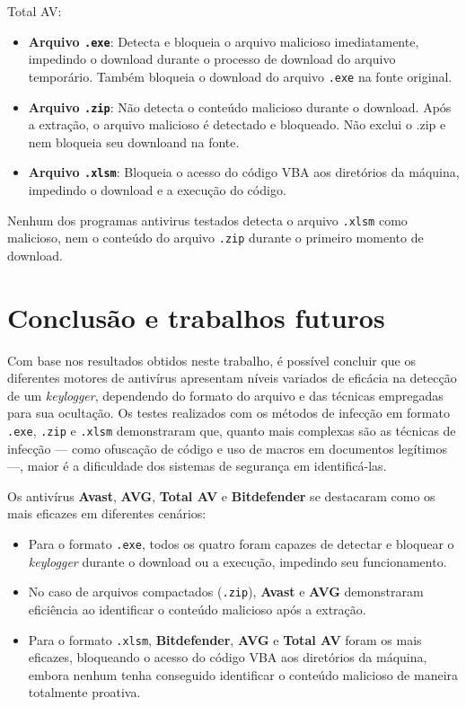 \documentclass[12pt]{article}
\begin{document}
\noindent Total AV:
\begin{itemize}
    \item \textbf{Arquivo \texttt{.exe}}: Detecta e bloqueia o arquivo malicioso imediatamente, impedindo o download durante o processo de download do arquivo temporário. Também bloqueia o download do arquivo \texttt{.exe} na fonte original.
    \item \textbf{Arquivo \texttt{.zip}}: Não detecta o conteúdo malicioso durante o download. Após a extração, o arquivo malicioso é detectado e bloqueado. Não exclui o .zip e nem bloqueia seu downloand na fonte.
    \item \textbf{Arquivo \texttt{.xlsm}}: Bloqueia o acesso do código VBA aos diretórios da máquina, impedindo o download e a execução do código.
\end{itemize}

\noindent Nenhum dos programas antivirus testados detecta o arquivo \texttt{.xlsm} como malicioso, nem o conteúdo do arquivo \texttt{.zip} durante o primeiro momento de download.

\section{Conclusão e trabalhos futuros}
Com base nos resultados obtidos neste trabalho, 
é possível concluir que os diferentes motores de antivírus 
apresentam níveis variados de eficácia na detecção de um \textit{keylogger}, 
dependendo do formato do arquivo e das técnicas empregadas para sua ocultação. 
Os testes realizados com os métodos de infecção em formato \texttt{.exe}, 
\texttt{.zip} e \texttt{.xlsm} demonstraram que, quanto mais complexas são as 
técnicas de infecção --- como ofuscação de código e uso de macros em documentos 
legítimos ---, maior é a dificuldade dos sistemas de segurança em identificá-las.  

Os antivírus \textbf{Avast}, \textbf{AVG}, \textbf{Total AV} e \textbf{Bitdefender} se destacaram como os mais eficazes em diferentes cenários:  
\begin{itemize}
    \item Para o formato \texttt{.exe}, todos os quatro foram capazes de detectar e bloquear o \textit{keylogger} durante o download ou a execução, impedindo seu funcionamento.  
    \item No caso de arquivos compactados (\texttt{.zip}), \textbf{Avast} e \textbf{AVG} demonstraram eficiência ao identificar o conteúdo malicioso após a extração.  
    \item Para o formato \texttt{.xlsm}, \textbf{Bitdefender}, \textbf{AVG} e \textbf{Total AV} foram os mais eficazes, bloqueando o acesso do código VBA aos diretórios da máquina, embora nenhum tenha conseguido identificar o conteúdo malicioso de maneira totalmente proativa.  
\end{itemize}    
\end{document}
